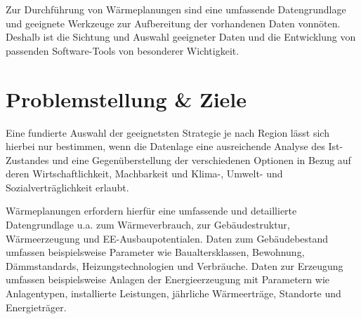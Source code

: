		Zur Durchführung von Wärmeplanungen sind eine umfassende Datengrundlage und geeignete Werkzeuge zur Aufbereitung der vorhandenen Daten vonnöten. Deshalb ist die Sichtung und Auswahl geeigneter Daten und die Entwicklung von passenden Software-Tools von besonderer Wichtigkeit. 
		
		
		
		

	\section{Problemstellung \& Ziele}
		
		Eine fundierte Auswahl der geeignetsten Strategie je nach Region lässt sich hierbei nur bestimmen, wenn die Datenlage eine ausreichende Analyse des Ist-Zustandes und eine Gegenüberstellung der verschiedenen Optionen in Bezug auf deren Wirtschaftlichkeit, Machbarkeit und Klima-, Umwelt- und Sozialverträglichkeit erlaubt.
		
		Wärmeplanungen erfordern hierfür eine umfassende und detaillierte Datengrundlage u.a. zum Wärmeverbrauch, zur Gebäudestruktur, Wärmeerzeugung und EE-Ausbaupotentialen. Daten zum Gebäudebestand umfassen beispielsweise Parameter wie Baualtersklassen, Bewohnung, Dämmstandards, Heizungstechnologien und Verbräuche. Daten zur Erzeugung umfassen beispielsweise Anlagen der Energieerzeugung mit Parametern wie Anlagentypen, installierte Leistungen, jährliche Wärmeerträge, Standorte und Energieträger. 
		
